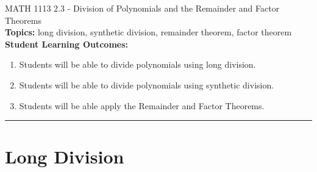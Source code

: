 \documentclass[11pt]{article}
\begin{document}
\noindent MATH 1113   \hfill 2.3 - Division of Polynomials and the Remainder and Factor Theorems\\



\noindent \textbf{Topics:}  long division, synthetic division, remainder theorem, factor theorem\\

\noindent \textbf{Student Learning Outcomes:}
\begin{enumerate}
\item Students will be able to divide polynomials using long division.
\item Students will be able to divide polynomials using synthetic division.
\item Students will be able apply the Remainder and Factor Theorems.

\end{enumerate}

\hrule 
\vspace{5mm}

\section{Long Division}
\end{document}
